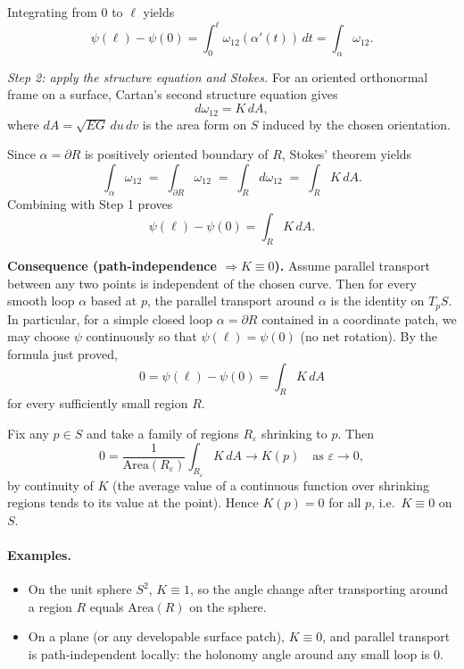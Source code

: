 \documentclass[12pt,a4paper]{article}
\theoremstyle{plain}
\theoremstyle{definition}      %
\begin{document}
	Integrating from $0$ to $\ell$ yields
	\[
	\psi(\ell)-\psi(0)=\int_0^\ell \omega_{12}(\alpha'(t))\,dt = \int_\alpha \omega_{12}.
	\]
	
	\textit{Step 2: apply the structure equation and Stokes.}
	For an oriented orthonormal frame on a surface, Cartan's second structure equation gives
	\[
	d\omega_{12} = K\,dA,
	\]
	where $dA=\sqrt{EG}\,du\,dv$ is the area form on $S$ induced by the chosen orientation.
	
	Since $\alpha=\partial R$ is positively oriented boundary of $R$, Stokes' theorem yields
	\[
	\int_\alpha \omega_{12} \;=\; \int_{\partial R}\omega_{12}\;=\;\int_R d\omega_{12}\;=\;\int_R K\,dA.
	\]
	Combining with Step 1 proves
	\[
	\psi(\ell)-\psi(0)=\int_R K\,dA.
	\]
	
	\medskip
	
	\textbf{Consequence (path-independence $\Rightarrow K\equiv 0$).}
	Assume parallel transport between any two points is independent of the chosen curve.
	Then for every smooth loop $\alpha$ based at $p$, the parallel transport around $\alpha$ is the identity on $T_pS$.
	In particular, for a simple closed loop $\alpha=\partial R$ contained in a coordinate patch, we may choose
	$\psi$ continuously so that $\psi(\ell)=\psi(0)$ (no net rotation).
	By the formula just proved,
	\[
	0=\psi(\ell)-\psi(0)=\int_R K\,dA
	\]
	for every sufficiently small region $R$.
	
	Fix any $p\in S$ and take a family of regions $R_\varepsilon$ shrinking to $p$.
	Then
	\[
	0=\frac{1}{\mathrm{Area}(R_\varepsilon)}\int_{R_\varepsilon} K\,dA \longrightarrow K(p)
	\quad\text{as }\varepsilon\to 0,
	\]
	by continuity of $K$ (the average value of a continuous function over shrinking regions tends to its value at the point).
	Hence $K(p)=0$ for all $p$, i.e.\ $K\equiv 0$ on $S$.
	
	\paragraph{Examples.}
	\begin{itemize}
		\item On the unit sphere $S^2$, $K\equiv 1$, so the angle change after transporting around a region $R$
		equals $\mathrm{Area}(R)$ on the sphere.
		\item On a plane (or any developable surface patch), $K\equiv 0$, and parallel transport is path-independent locally:
		the holonomy angle around any small loop is $0$.
	\end{itemize}
	
\end{document}
